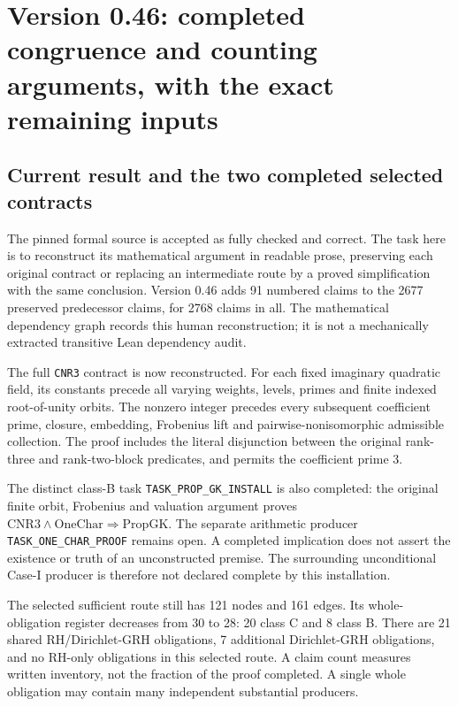\section{Version 0.46: completed congruence and counting arguments, with the exact remaining inputs}
\label{sec:dependency-audit-v46}

\subsection{Current result and the two completed selected contracts}

The pinned formal source is accepted as fully checked and correct.
The task here is to reconstruct its mathematical argument in readable
prose, preserving each original contract or replacing an intermediate
route by a proved simplification with the same conclusion.
Version 0.46 adds 91 numbered claims to the 2677 preserved predecessor
claims, for 2768 claims in all. The mathematical dependency graph
records this human reconstruction; it is not a mechanically extracted
transitive Lean dependency audit.

The full \texttt{CNR3} contract is now reconstructed. For each fixed
imaginary quadratic field, its constants precede all varying weights,
levels, primes and finite indexed root-of-unity orbits. The nonzero
integer precedes every subsequent coefficient prime, closure, embedding,
Frobenius lift and pairwise-nonisomorphic admissible collection. The
proof includes the literal disjunction between the original rank-three
and rank-two-block predicates, and permits the coefficient prime 3.

The distinct class-B task \texttt{TASK\_\allowbreak PROP\_\allowbreak GK\_\allowbreak INSTALL} is also
completed: the original finite orbit, Frobenius and valuation argument
proves \(\mathrm{CNR3}\land\mathrm{OneChar}\Rightarrow
\mathrm{PropGK}\). The separate arithmetic producer
\texttt{TASK\_\allowbreak ONE\_\allowbreak CHAR\_\allowbreak PROOF} remains open. A completed implication
does not assert the existence or truth of an unconstructed premise.
The surrounding unconditional Case-I producer is therefore not declared
complete by this installation.

The selected sufficient route still has 121 nodes and 161 edges.
Its whole-obligation register decreases from 30 to 28: 20 class C and
8 class B. There are 21 shared RH/Dirichlet-GRH obligations, 7 additional
Dirichlet-GRH obligations, and no RH-only obligations in this selected
route. A claim count measures written inventory, not the fraction of
the proof completed. A single whole obligation may contain many
independent substantial producers.

